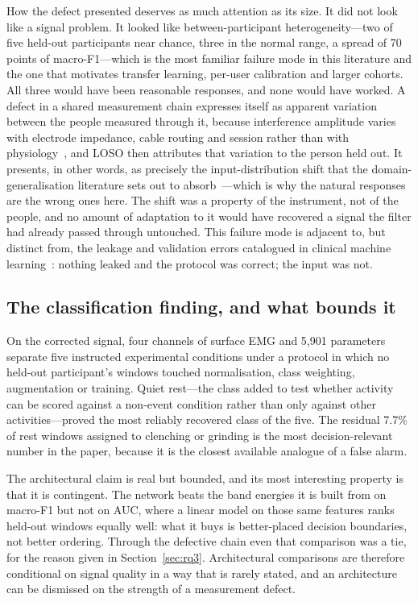 \documentclass[pdflatex,sn-nature,iicol]{sn-jnl}
\begin{document}
How the defect presented deserves as much attention as its size. It did not look like a signal problem. It looked like between-participant heterogeneity---two of five held-out participants near chance, three in the normal range, a spread of 70 points of macro-F1---which is the most familiar failure mode in this literature and the one that motivates transfer learning, per-user calibration and larger cohorts. All three would have been reasonable responses, and none would have worked. A defect in a shared measurement chain expresses itself as apparent variation between the people measured through it, because interference amplitude varies with electrode impedance, cable routing and session rather than with physiology~\cite{deluca2010filtering,besomi2019consensus}, and LOSO then attributes that variation to the person held out. It presents, in other words, as precisely the input-distribution shift that the domain-generalisation literature sets out to absorb~\cite{wang2022generalizing,kouw2021review}---which is why the natural responses are the wrong ones here. The shift was a property of the instrument, not of the people, and no amount of adaptation to it would have recovered a signal the filter had already passed through untouched. This failure mode is adjacent to, but distinct from, the leakage and validation errors catalogued in clinical machine learning~\cite{saeb2017need,kapoor2023leakage,varoquaux2022machine}: nothing leaked and the protocol was correct; the input was not.

\subsection{The classification finding, and what bounds it}

On the corrected signal, four channels of surface EMG and 5,901 parameters separate five instructed experimental conditions under a protocol in which no held-out participant's windows touched normalisation, class weighting, augmentation or training. Quiet rest---the class added to test whether activity can be scored against a non-event condition rather than only against other activities---proved the most reliably recovered class of the five. The residual 7.7\% of rest windows assigned to clenching or grinding is the most decision-relevant number in the paper, because it is the closest available analogue of a false alarm.

The architectural claim is real but bounded, and its most interesting property is that it is contingent. The network beats the band energies it is built from on macro-F1 but not on AUC, where a linear model on those same features ranks held-out windows equally well: what it buys is better-placed decision boundaries, not better ordering. Through the defective chain even that comparison was a tie, for the reason given in Section~\ref{sec:rq3}. Architectural comparisons are therefore conditional on signal quality in a way that is rarely stated, and an architecture can be dismissed on the strength of a measurement defect.
\end{document}
